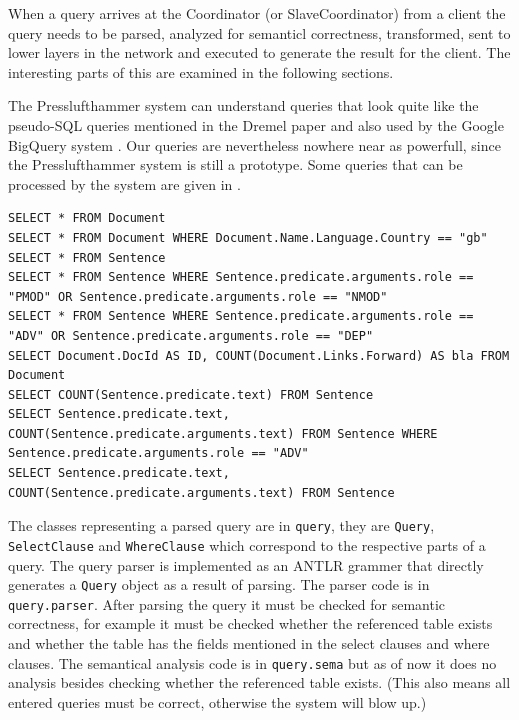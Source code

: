 When a query arrives at the Coordinator (or SlaveCoordinator) from a client
the query needs to be parsed, analyzed for semanticl correctness,
transformed, sent to lower layers in the network and executed to generate
the result for the client. The interesting parts of this
are examined in the following sections.

The Presslufthammer system can understand queries that look quite like
the pseudo-SQL queries mentioned in the Dremel paper \cite{melnik2010dremel}
and also used by the Google BigQuery system \cite{bigquery}. Our queries
are nevertheless nowhere near as powerfull, since the Presslufthammer system
is still a prototype. 
Some queries that can be processed by the system
are given in .

\begin{lstlisting}[basicstyle=\scriptsize\ttfamily,float=htpb,label={lst:queries},caption={Some example queries that can be processed by Presslufthammer.}]
SELECT * FROM Document
SELECT * FROM Document WHERE Document.Name.Language.Country == "gb"
SELECT * FROM Sentence
SELECT * FROM Sentence WHERE Sentence.predicate.arguments.role == "PMOD" OR Sentence.predicate.arguments.role == "NMOD"
SELECT * FROM Sentence WHERE Sentence.predicate.arguments.role == "ADV" OR Sentence.predicate.arguments.role == "DEP"
SELECT Document.DocId AS ID, COUNT(Document.Links.Forward) AS bla FROM Document
SELECT COUNT(Sentence.predicate.text) FROM Sentence
SELECT Sentence.predicate.text, COUNT(Sentence.predicate.arguments.text) FROM Sentence WHERE Sentence.predicate.arguments.role == "ADV"
SELECT Sentence.predicate.text, COUNT(Sentence.predicate.arguments.text) FROM Sentence
\end{lstlisting}

The classes representing a parsed query are in \texttt{query}, they
are \texttt{Query}, \texttt{SelectClause} and \texttt{WhereClause} which
correspond to the respective parts of a query.
The query parser is implemented as an ANTLR \cite{antlr} grammer that directly
generates a \texttt{Query} object as a result of parsing. The parser code
is in \texttt{query.parser}. After parsing the query it must be checked
for semantic correctness, for example it must be checked whether the
referenced table exists and whether the table has the fields mentioned
in the select clauses and where clauses. The semantical analysis code
is in \texttt{query.sema} but as of now it does no analysis besides checking
whether the referenced table exists. (This also means all entered queries
must be correct, otherwise the system will blow up.)

